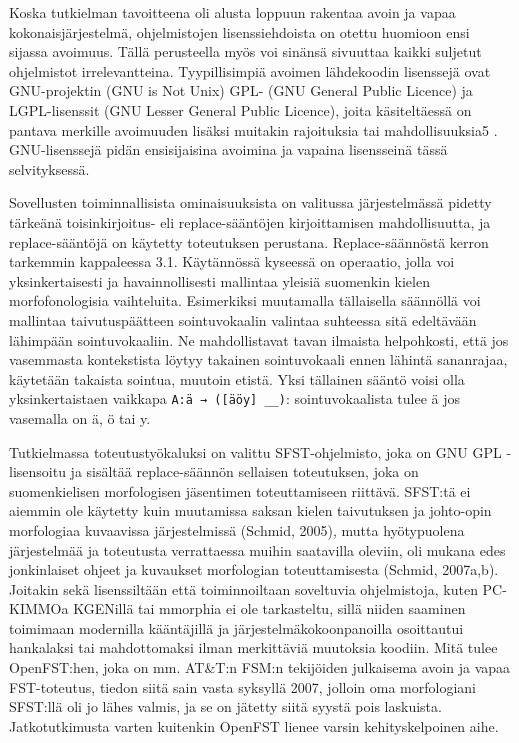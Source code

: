 \documentclass[free]{flammie}
\begin{document}
Koska tutkielman tavoitteena oli alusta loppuun rakentaa avoin ja vapaa
kokonaisjärjestelmä, ohjelmistojen lisenssiehdoista on otettu huomioon ensi
sijassa avoimuus. Tällä perusteella myös voi sinänsä sivuuttaa kaikki suljetut
ohjelmistot irrelevantteina. Tyypillisimpiä avoimen lähdekoodin lisenssejä ovat
GNU-projektin (GNU is Not Unix) GPL- (GNU General Public Licence) ja
LGPL-lisenssit (GNU Lesser General Public Licence), joita käsiteltäessä on
pantava merkille avoimuuden lisäksi muitakin rajoituksia tai mahdollisuuksia5 .
GNU-lisenssejä pidän ensisijaisina avoimina ja vapaina lisensseinä tässä
selvityksessä.

Sovellusten toiminnallisista ominaisuuksista on valitussa järjestelmässä pidetty
tärkeänä toisinkirjoitus- eli replace-sääntöjen kirjoittamisen mahdollisuutta,
ja replace-sääntöjä on käytetty toteutuksen perustana. Replace-säännöstä kerron
tarkemmin kappaleessa 3.1. Käytännössä kyseessä on operaatio, jolla voi
yksinkertaisesti ja havainnollisesti mallintaa yleisiä suomenkin kielen
morfofonologisia vaihteluita. Esimerkiksi muutamalla tällaisella säännöllä voi
mallintaa taivutuspäätteen sointuvokaalin valintaa suhteessa sitä edeltävään
lähimpään sointuvokaaliin. Ne mahdollistavat tavan ilmaista helpohkosti, että
jos vasemmasta kontekstista löytyy takainen sointuvokaali ennen lähintä
sananrajaa, käytetään takaista sointua, muutoin etistä. Yksi tällainen sääntö
voisi olla yksinkertaistaen vaikkapa \verb|A:ä → ([äöy] __)|: sointuvokaalista
tulee ä jos vasemalla on ä, ö tai y.

Tutkielmassa toteutustyökaluksi on valittu SFST-ohjelmisto, joka on GNU GPL
-lisensoitu ja sisältää replace-säännön sellaisen toteutuksen, joka on
suomenkielisen morfologisen jäsentimen toteuttamiseen riittävä. SFST:tä ei
aiemmin ole käytetty kuin muutamissa saksan kielen taivutuksen ja johto-opin
morfologiaa kuvaavissa järjestelmissä (Schmid, 2005), mutta hyötypuolena
järjestelmää ja toteutusta verrattaessa muihin saatavilla oleviin, oli mukana
edes jonkinlaiset ohjeet ja kuvaukset morfologian toteuttamisesta (Schmid,
2007a,b). Joitakin sekä lisenssiltään että toiminnoiltaan soveltuvia
ohjelmistoja, kuten PC-KIMMOa KGENillä tai mmorphia ei ole tarkasteltu, sillä
niiden saaminen toimimaan modernilla kääntäjillä ja järjestelmäkokoonpanoilla
osoittautui hankalaksi tai mahdottomaksi ilman merkittäviä muutoksia koodiin.
Mitä tulee OpenFST:hen, joka on mm.  AT\&T:n FSM:n tekijöiden julkaisema avoin
ja vapaa FST-toteutus, tiedon siitä sain vasta syksyllä 2007, jolloin oma
morfologiani SFST:llä oli jo lähes valmis, ja se on jätetty siitä syystä pois
laskuista. Jatkotutkimusta varten kuitenkin OpenFST lienee varsin
kehityskelpoinen aihe.
\end{document}

